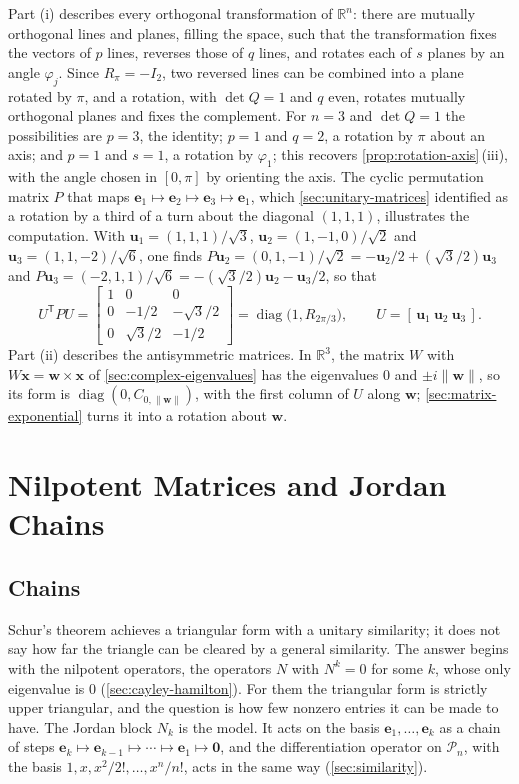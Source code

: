 Part (i) describes every orthogonal transformation of $\mathbb R^n$: there are mutually orthogonal lines and planes, filling the space, such that the transformation fixes the vectors of $p$ lines, reverses those of $q$ lines, and rotates each of $s$ planes by an angle $\varphi_j$. Since $R_\pi=-I_2$, two reversed lines can be combined into a plane rotated by $\pi$, and a rotation, with $\det Q=1$ and $q$ even, rotates mutually orthogonal planes and fixes the complement. For $n=3$ and $\det Q=1$ the possibilities are $p=3$, the identity; $p=1$ and $q=2$, a rotation by $\pi$ about an axis; and $p=1$ and $s=1$, a rotation by $\varphi_1$; this recovers \cref{prop:rotation-axis}\,(iii), with the angle chosen in $[0,\pi]$ by orienting the axis. The cyclic permutation matrix $P$ that maps $\mathbf e_1\mapsto\mathbf e_2\mapsto\mathbf e_3\mapsto\mathbf e_1$, which \cref{sec:unitary-matrices} identified as a rotation by a third of a turn about the diagonal $(1,1,1)$, illustrates the computation. With $\mathbf u_1=(1,1,1)/\sqrt3$, $\mathbf u_2=(1,-1,0)/\sqrt2$ and $\mathbf u_3=(1,1,-2)/\sqrt6$, one finds $P\mathbf u_2=(0,1,-1)/\sqrt2=-\mathbf u_2/2+(\sqrt3/2)\mathbf u_3$ and $P\mathbf u_3=(-2,1,1)/\sqrt6=-(\sqrt3/2)\mathbf u_2-\mathbf u_3/2$, so that
\[
U^{\mathsf T}PU=\begin{bmatrix}1&0&0\\0&-1/2&-\sqrt3/2\\0&\sqrt3/2&-1/2\end{bmatrix}=\operatorname{diag}\bigl(1,R_{2\pi/3}\bigr),\qquad U=[\,\mathbf u_1\ \mathbf u_2\ \mathbf u_3\,].
\]
Part (ii) describes the antisymmetric matrices. In $\mathbb R^3$, the matrix $W$ with $W\mathbf x=\mathbf w\times\mathbf x$ of \cref{sec:complex-eigenvalues} has the eigenvalues $0$ and $\pm i\|\mathbf w\|$, so its form is $\operatorname{diag}(0,C_{0,\|\mathbf w\|})$, with the first column of $U$ along $\mathbf w$; \cref{sec:matrix-exponential} turns it into a rotation about $\mathbf w$.

\section{Nilpotent Matrices and Jordan Chains}
\label{sec:nilpotent}

\subsection{Chains}

Schur's theorem achieves a triangular form with a unitary similarity; it does not say how far the triangle can be cleared by a general similarity. The answer begins with the nilpotent operators, the operators $N$ with $N^k=0$ for some $k$, whose only eigenvalue is $0$ (\cref{sec:cayley-hamilton}). For them the triangular form is strictly upper triangular, and the question is how few nonzero entries it can be made to have. The Jordan block $N_k$ is the model. It acts on the basis $\mathbf e_1,\ldots,\mathbf e_k$ as a chain of steps $\mathbf e_k\mapsto\mathbf e_{k-1}\mapsto\cdots\mapsto\mathbf e_1\mapsto\mathbf 0$, and the differentiation operator on $\mathcal P_n$, with the basis $1,x,x^2/2!,\ldots,x^n/n!$, acts in the same way (\cref{sec:similarity}).

